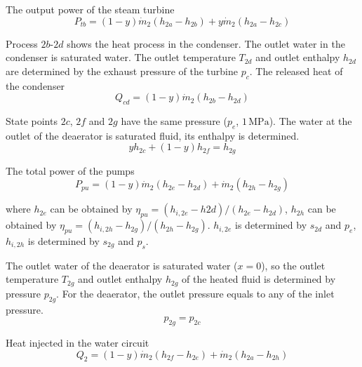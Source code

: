     The output power of the steam turbine
    \begin{equation}
  P_{tb}=\left(1-y\right)\dot{m}_{2}\left(h_{2a}-h_{2b}\right)+y\dot{m}_{2}\left(h_{2a}-h_{2c}\right)
  \end{equation}
  
  Process $2b$-$2d$ shows the heat process in the condenser. The outlet water in the condenser is saturated water. The outlet temperature $T_{2d}$ and outlet enthalpy $h_{2d}$ are determined by the exhaust pressure of the turbine $p_c$.
  The released heat of the condenser
  \begin{equation}
      Q_{cd} = (1-y)\dot{m}_2 (h_{2b} - h_{2d})
\end{equation}

  State points $2c$, $2f$ and $2g$ have the same pressure ($p_e$, $1\,\mathrm{MPa}$). The water at the outlet of the deaerator is saturated fluid, its enthalpy is determined.
  \begin{equation}
  y h_{2c} + (1-y) h_{2f} = h_{2g}
\end{equation}
  
  The total power of the pumps 
  \begin{equation}
	P_{pu}=\left(1-y\right)\dot{m}_{2}\left(h_{2e}-h_{2d}\right)+\dot{m}_{2}\left(h_{2h}-h_{2g}\right)
\end{equation}
    
    where $h_{2e}$ can be obtained by $\eta_{pu} = (h_{i,2e}-h{2d})/(h_{2e}-h_{2d})$, $h_{2h}$ can be obtained by $\eta_{pu} = (h_{i,2h}-h_{2g})/(h_{2h}-h_{2g})$. $h_{i,2e}$ is determined by $s_{2d}$ and $p_e$, $h_{i,2h}$ is determined by $s_{2g}$ and $p_s$.
    
    The outlet water of the deaerator is saturated water ($x = 0$), so the outlet temperature $T_{2g}$ and outlet enthalpy $h_{2g}$ of the heated fluid is determined by pressure $p_{2g}$. For the deaerator, the outlet pressure equals to any of the inlet pressure.
    \begin{equation}
  p_{2g} = p_{2c}
\end{equation}

    
  Heat injected in the water circuit
\begin{equation}
	    Q_2=\left(1-y\right)\dot{m}_{2}\left(h_{2f}-h_{2e}\right)+\dot{m}_{2}\left(h_{2a}-h_{2h}\right)
    \end{equation}

